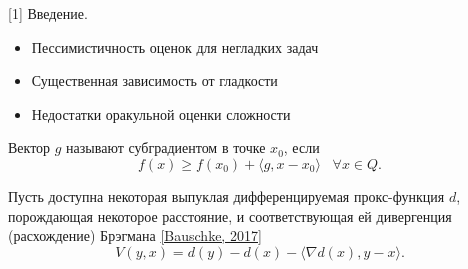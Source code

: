\begin{frame}{[1] Введение.}
    \begin{itemize}
        \item Пессимистичность оценок для негладких задач
        \item Существенная зависимость от гладкости
        \item Недостатки оракульной оценки сложности
    \end{itemize}
    \vspace{\baselineskip}

    Вектор $g$ называют субградиентом в точке $x_0$, если
    $$
        f(x) \geq f(x_0) + \langle g, x - x_0 \rangle \;\;\; \forall x \in Q.
    $$
    
    Пусть доступна некоторая выпуклая дифференцируемая прокс-функция $d$, порождающая некоторое расстояние, и соответствующая ей дивергенция (расхождение) Брэгмана \href{https://cmps-people.ok.ubc.ca/bauschke/Research/103.pdf}{[Bauschke, 2017]}
    \[
        V(y, x) = d(y) - d(x) - \langle \nabla d(x), y - x \rangle.
    \]
\end{frame}


